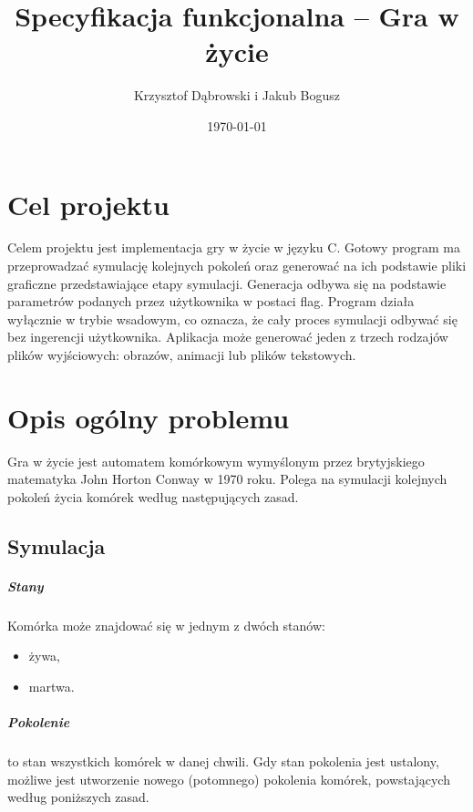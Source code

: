 \documentclass{report}
\title{Specyfikacja funkcjonalna -- Gra w życie}
\author{Krzysztof Dąbrowski i Jakub Bogusz}
\date{\today}
\begin{document}
\maketitle{}

\tableofcontents{}

\chapter{Cel projektu}
Celem projektu jest implementacja gry w życie w języku C. Gotowy program ma przeprowadzać symulację kolejnych pokoleń oraz generować na ich podstawie pliki graficzne przedstawiające etapy symulacji. Generacja odbywa się na podstawie parametrów podanych przez użytkownika w postaci flag. Program działa wyłącznie w trybie wsadowym, co oznacza, że cały proces symulacji odbywać się bez ingerencji użytkownika. Aplikacja może generować jeden z trzech rodzajów plików wyjściowych: obrazów, animacji lub plików tekstowych.

\chapter{Opis ogólny problemu}
Gra w życie jest automatem komórkowym wymyślonym przez brytyjskiego matematyka John Horton Conway
w 1970 roku. Polega na symulacji kolejnych pokoleń życia komórek według następujących zasad.

\section{Symulacja}

\paragraph{Stany}  Komórka może znajdować się w jednym z dwóch stanów:
\begin{itemize}
\item żywa,
\item martwa.
\end{itemize}

\paragraph{Pokolenie} to stan wszystkich komórek w danej chwili. Gdy stan pokolenia jest ustalony, możliwe jest utworzenie nowego (potomnego) pokolenia komórek, powstających według poniższych zasad.
\end{document}
